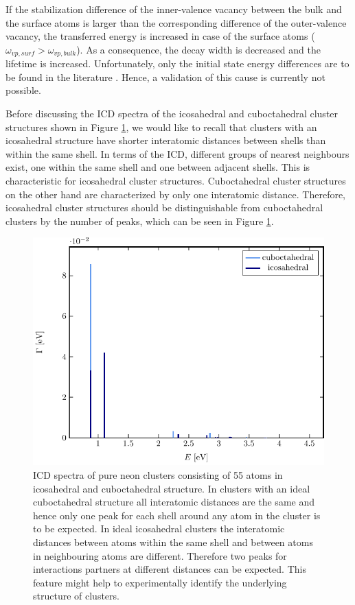 If the stabilization difference of the inner-valence vacancy between the bulk
and the surface atoms is larger than the corresponding difference of
the outer-valence
vacancy, the transferred energy is increased in case of the surface atoms
($\omega_{vp,surf} > \omega_{vp,bulk}$). As a consequence, the decay width
is decreased and the lifetime is increased. Unfortunately, only the initial
state energy differences are to be found in the literature \cite{Ohrwall04}.
Hence, a validation of this cause is currently not possible.


Before discussing the ICD spectra  of the icosahedral and cuboctahedral
cluster structures shown in Figure \ref{figure:reinNe}, we would like to
recall that clusters with an icosahedral structure
have shorter interatomic distances between shells than within the same
shell.
In terms of the ICD, different groups of nearest neighbours exist,
one within the same shell and one
between adjacent shells. This is characteristic for icosahedral cluster
structures. Cuboctahedral cluster structures on the other hand are characterized
by only one interatomic distance. 
Therefore, icosahedral cluster structures should be distinguishable from
cuboctahedral clusters by the number of peaks, which can be seen in Figure
\ref{figure:reinNe}.

\begin{figure}[h]
 \centering
 \includegraphics[width=\columnwidth]{pics/reinNe}
 \caption{ICD spectra of pure neon clusters consisting of 55 atoms in
          icosahedral and cuboctahedral structure. In clusters with an
          ideal cuboctahedral structure
          all interatomic distances are the same and hence only one peak
          for each shell around any atom in the cluster is to be expected.
          In ideal icosahedral clusters the interatomic distances between atoms
          within the same shell and between atoms in neighbouring atoms
          are different. Therefore two peaks for interactions partners
          at different distances can be expected. This feature might
          help to experimentally identify the underlying structure of clusters.}
 \label{figure:reinNe}
\end{figure}

